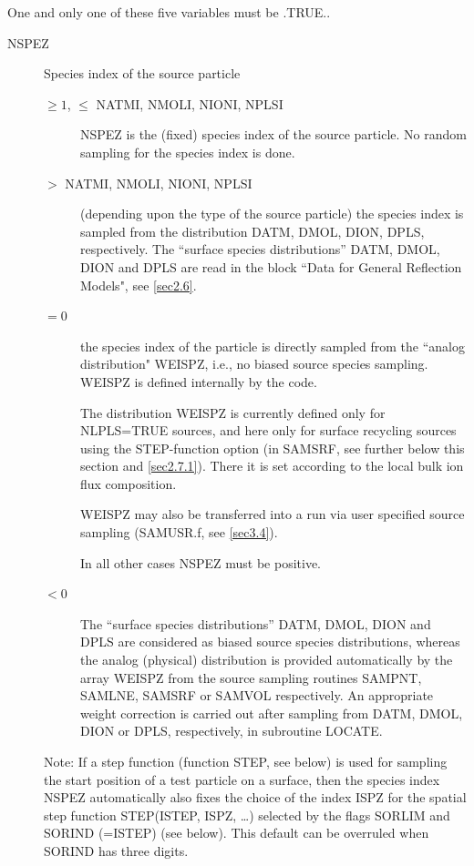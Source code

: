 One and only one of these five variables must be .TRUE..

\begin{description}
  \item[NSPEZ] Species index of the source particle
        \begin{description}
          \item[$\ge 1$, $\le$	  NATMI, NMOLI, NIONI, NPLSI] NSPEZ is the (fixed)
                species index of the source particle.
                No random sampling for the species index is done.
          \item[$>$  NATMI, NMOLI, NIONI, NPLSI] (depending upon the type of the source
                particle) the species index is sampled from the distribution DATM, DMOL, DION,
                DPLS, respectively.
                The ``surface species distributions'' DATM, DMOL, DION and DPLS are read in the
                block ``Data for General Reflection Models", see \cref{sec2.6}.
          \item[$= 0$] the species index of the particle is directly sampled from the
                ``analog distribution" WEISPZ, i.e., no biased source species sampling.
                WEISPZ is defined internally by the code.

                The distribution WEISPZ is currently defined only for NLPLS=TRUE sources, and
                here only for surface recycling sources using the STEP-function option (in
                SAMSRF, see further below this section and \cref{sec2.7.1}).
                There it is set according to the local bulk ion flux composition.

                WEISPZ may also be transferred into a run via user specified source sampling
                (SAMUSR.f, see \cref{sec3.4}).

                In all other cases NSPEZ must be positive.

          \item[$<  0$] The ``surface species distributions'' DATM, DMOL, DION and DPLS
                are considered as biased source species distributions, whereas the analog
                (physical) distribution is provided automatically by the array WEISPZ from the
                source sampling routines SAMPNT, SAMLNE, SAMSRF or SAMVOL respectively.
                An appropriate weight correction is carried out after sampling from DATM, DMOL,
                DION or DPLS, respectively, in subroutine LOCATE.

        \end{description}

        Note: If a step function (function STEP, see below) is used for sampling the
        start position of a test particle on a surface, then the species index NSPEZ
        automatically also fixes the choice of the index ISPZ for the spatial step
        function STEP(ISTEP, ISPZ, \dots) selected by the flags SORLIM and SORIND
        (=ISTEP) (see below).
        This default can be overruled  when SORIND has three digits.

\end{description}

